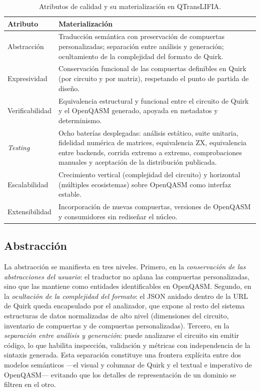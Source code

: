 \documentclass[11pt,a4paper]{article}
\begin{document}
\begin{table}[htbp]
\centering
\small
\caption{Atributos de calidad y su materialización en QTransLIFIA.}
\label{tab:atributos}
\begin{tabular}{@{}p{}p{}@{}}
\toprule
\textbf{Atributo} & \textbf{Materialización} \\
\midrule
Abstracción & Traducción semántica con preservación de compuertas personalizadas; separación entre análisis y generación; ocultamiento de la complejidad del formato de Quirk. \\
Expresividad & Conservación funcional de las compuertas definibles en Quirk (por circuito y por matriz), respetando el punto de partida de diseño. \\
Verificabilidad & Equivalencia estructural y funcional entre el circuito de Quirk y el OpenQASM generado, apoyada en metadatos y determinismo. \\
\emph{Testing} & Ocho baterías desplegadas: análisis estático, suite unitaria, fidelidad numérica de matrices, equivalencia ZX, equivalencia entre backends, corrida extremo a extremo, comprobaciones manuales y aceptación de la distribución publicada. \\
Escalabilidad & Crecimiento vertical (complejidad del circuito) y horizontal (múltiples ecosistemas) sobre OpenQASM como interfaz estable. \\
Extensibilidad & Incorporación de nuevas compuertas, versiones de OpenQASM y consumidores sin rediseñar el núcleo. \\
\bottomrule
\end{tabular}
\end{table}

\subsection{Abstracción}

La abstracción se manifiesta en tres niveles. Primero, en la \emph{conservación de las
abstracciones del usuario}: el traductor no aplana las compuertas personalizadas, sino que
las mantiene como entidades identificables en OpenQASM. Segundo, en la \emph{ocultación de
la complejidad del formato}: el JSON anidado dentro de la URL de Quirk queda encapsulado por
el analizador, que expone al resto del sistema estructuras de datos normalizadas de alto
nivel (dimensiones del circuito, inventario de compuertas y de compuertas personalizadas).
Tercero, en la \emph{separación entre análisis y generación}: puede analizarse el circuito
sin emitir código, lo que habilita inspección, validación y métricas con independencia de la
sintaxis generada. Esta separación constituye una frontera explícita entre dos modelos
semánticos ---el visual y columnar de Quirk y el textual e imperativo de OpenQASM---
evitando que los detalles de representación de un dominio se filtren en el otro.
\end{document}
